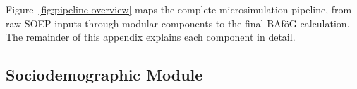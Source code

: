 %
%
%
%
%
%
%
%
%
%
%
%



Figure~\ref{fig:pipeline-overview} maps the complete microsimulation pipeline, from raw SOEP inputs through modular components to the final BAföG calculation. The remainder of this appendix explains each component in detail.

\subsection{Sociodemographic Module}

